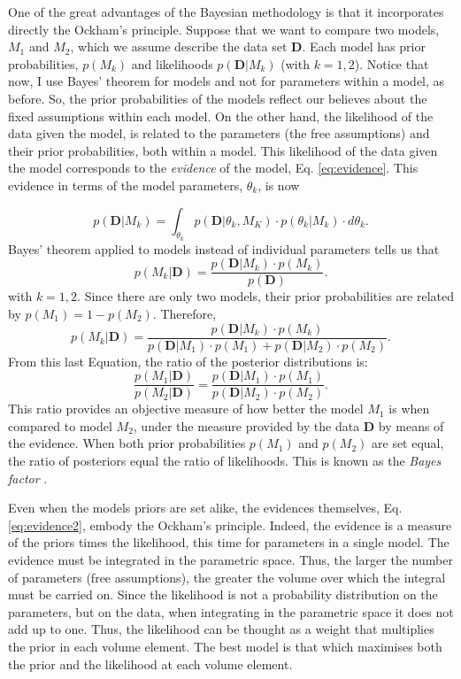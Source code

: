 One of the great advantages of the Bayesian methodology is that it incorporates directly the Ockham's principle. Suppose that we want to compare two models, $M_1$ and $M_2$, which we assume describe the data set $\mathbf{D}$. Each model has prior probabilities, $p(M_k)$ and likelihoods $p(\mathbf{D}|M_k)$ (with $k=1,2$). Notice that now, I use Bayes' theorem for models and not for parameters within a model, as before. So, the prior probabilities of the models reflect our believes about the fixed assumptions within each model. On the other hand, the likelihood of the data given the model, is related to the parameters (the free assumptions) and their prior probabilities, both within a model. This likelihood of the data given the model corresponds to the \emph{evidence} of the model, Eq. \ref{eq:evidence}. This evidence in terms of the model parameters, $\theta_k$, is now

 \begin{equation}
p(\mathbf{D}|M_k)=\int_{\theta_k} p(\mathbf{D}|\theta_k,M_K)\cdot p(\theta_k|M_k)\cdot d\theta_k. \label{eq:evidence2}
\end{equation}
Bayes' theorem applied to models instead of individual parameters tells us that
\begin{equation}
p(M_k|\mathbf{D})=\frac{p(\mathbf{D}|M_k)\cdot p(M_k)}{p(\mathbf{D})}.
\end{equation}
with $k=1,2$. Since there are only two models, their prior probabilities are related by $p(M_1)= 1- p(M_2)$. Therefore,
 \begin{equation}
p(M_k|\mathbf{D})=\frac{p(\mathbf{D}|M_k)\cdot p(M_k)}{p(\mathbf{D}|M_1)\cdot p(M_1)+p(\mathbf{D}|M_2)\cdot p(M_2)}.
\end{equation}
From this last Equation, the ratio of the posterior distributions is:
\begin{equation}
\frac{p(M_1|\mathbf{D})}{p(M_2|\mathbf{D})}=\frac{p(\mathbf{D}|M_1)\cdot p(M_1)}{p(\mathbf{D}|M_2)\cdot p(M_2)}.
\end{equation}
This ratio provides an objective measure of how better the model $M_1$ is when compared to model $M_2$, under the measure provided by the data $\mathbf{D}$ by means of the evidence. When both prior probabilities  $p(M_1)$ and $p(M_2)$ are set equal, the ratio of posteriors equal the ratio of likelihoods. This is known as the \emph{Bayes factor} \cite[for a similar derivation and some examples of its application see][]{Kaas1995}. 

Even when the models priors are set alike, the evidences themselves, Eq. \ref{eq:evidence2}, embody the Ockham's principle. Indeed, the evidence is a measure of the priors times the likelihood, this time for parameters in a single model. The evidence must be integrated in the parametric space. Thus, the larger the number of parameters (free assumptions), the greater the volume over which the integral must be carried on. Since the likelihood is not a probability distribution on the parameters, but on the data, when integrating in the parametric space it does not add up to one. Thus, the likelihood can be thought as a weight that multiplies the prior in each volume element. The best model is that which maximises both the prior and the likelihood at each volume element. 

